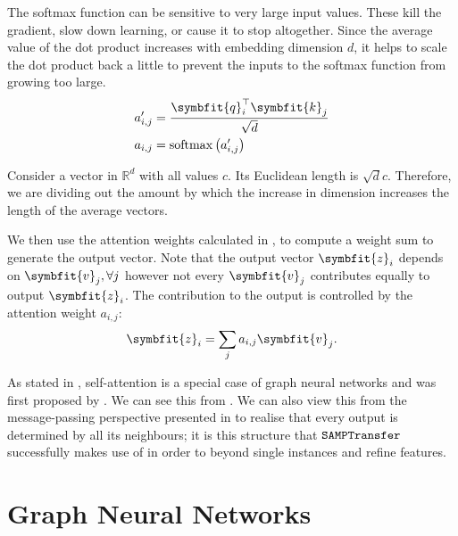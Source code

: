 The softmax function can be sensitive to very large input values. These kill the gradient, slow down learning, or cause it to stop altogether. Since the average value of the dot product increases with embedding dimension $d$, it helps to scale the dot product back a little to prevent the inputs to the softmax function from growing too large.
\begin{equation}
\label{eqn:qkv-attn-weight-calc}
\begin{split}
    a^\prime_{i, j} &= \frac{\symbfit{q}_i^\top \symbfit{k}_j}{\sqrt{d}}\\
    a_{i, j} &= \operatorname{softmax}\left( a^\prime_{i, j} \right)\\
\end{split}
\end{equation}

\begin{tcolorbox}[title=Why $\sqrt{d}$?]
Consider a vector in $\mathbb{R}^d$ with all values $c$. Its Euclidean length is $\sqrt{d}c$. Therefore, we are dividing out the amount by which the increase in dimension increases the length of the average vectors.
\end{tcolorbox}

We then use the attention weights calculated in , to compute a weight sum to generate the output vector. Note that the output vector $\symbfit{z}_i$ depends on $\symbfit{v}_j, \forall j$ however not every $\symbfit{v}_j$ contributes equally to output $\symbfit{z}_i$. The contribution to the output is controlled by the attention weight $a_{i, j}$:
\begin{equation}
    \label{eqn:qkv-attn-aggregation}
    \symbfit{z}_{i}=\sum_{j} a_{i, j} \symbfit{v}_{j}.
\end{equation}

As stated in , self-attention is a special case of graph neural networks and was first proposed by \textcite{vaswani2017attention}. We can see this from . We can also view this from the message-passing perspective presented in  to realise that every output is determined by all its neighbours; it is this structure that $\texttt{SAMPTransfer}$ successfully makes use of in order to  beyond single instances and refine features.

\newpage
\section{Graph Neural Networks}\label{sec:graph-nn}

